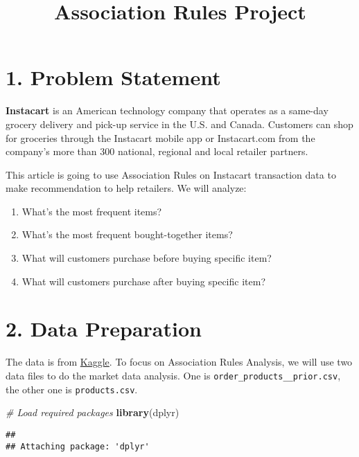\documentclass[]{article}
\title{Association Rules Project}
\author{}
\date{}
\newenvironment{Shaded}{\begin{snugshade}}{\end{snugshade}}
\newcommand{\CommentTok}[1]{\textcolor[rgb]{0.56,0.35,0.01}{\textit{#1}}}
\newcommand{\KeywordTok}[1]{\textcolor[rgb]{0.13,0.29,0.53}{\textbf{#1}}}
\newcommand{\NormalTok}[1]{#1}
\providecommand{\tightlist}{%
  \setlength{\itemsep}{0pt}\setlength{\parskip}{0pt}}
\begin{document}
\maketitle

\hypertarget{problem-statement}{%
\section{1. Problem Statement}\label{problem-statement}}

\textbf{Instacart} is an American technology company that operates as a
same-day grocery delivery and pick-up service in the U.S. and Canada.
Customers can shop for groceries through the Instacart mobile app or
Instacart.com from the company's more than 300 national, regional and
local retailer partners.

This article is going to use Association Rules on Instacart transaction
data to make recommendation to help retailers. We will analyze:

\begin{enumerate}
\def\labelenumi{\arabic{enumi}.}
\tightlist
\item
  What's the most frequent items?
\item
  What's the most frequent bought-together items?
\item
  What will customers purchase before buying specific item?
\item
  What will customers purchase after buying specific item?
\end{enumerate}

\hypertarget{data-preparation}{%
\section{2. Data Preparation}\label{data-preparation}}

The data is from
\href{https://www.kaggle.com/c/instacart-market-basket-analysis}{Kaggle}.
To focus on Association Rules Analysis, we will use two data files to do
the market data analysis. One is \texttt{order\_products\_\_prior.csv},
the other one is \texttt{products.csv}.

\begin{Shaded}
\begin{Highlighting}[]
\CommentTok{# Load required packages}
\KeywordTok{library}\NormalTok{(dplyr)}
\end{Highlighting}
\end{Shaded}

\begin{verbatim}
## 
## Attaching package: 'dplyr'
\end{verbatim}
\end{document}
